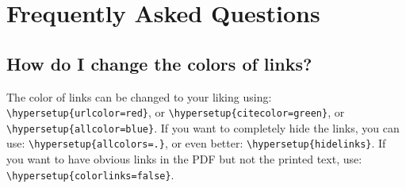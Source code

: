 \chapter{Frequently Asked Questions} %
\label{AppendixA} %

\section{How do I change the colors of links?}
The color of links can be changed to your liking using:
{\small\verb!\hypersetup{urlcolor=red}!}, or
{\small\verb!\hypersetup{citecolor=green}!}, or
{\small\verb!\hypersetup{allcolor=blue}!}.
\noindent If you want to completely hide the links, you can use:
{\small\verb!\hypersetup{allcolors=.}!}, or even better: 
{\small\verb!\hypersetup{hidelinks}!}.
\noindent If you want to have obvious links in the PDF but not the printed text, use:
{\small\verb!\hypersetup{colorlinks=false}!}.
